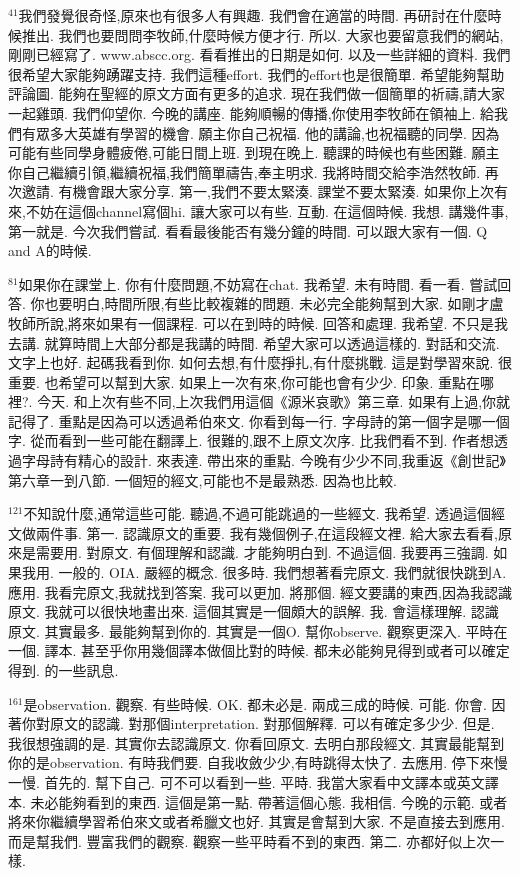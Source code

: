 \documentclass{book}
\begin{document}
$^{41}$我們發覺很奇怪,原來也有很多人有興趣.
我們會在適當的時間.
再研討在什麼時候推出.
我們也要問問李牧師,什麼時候方便才行.
所以.
大家也要留意我們的網站,剛剛已經寫了.
www.abscc.org.
看看推出的日期是如何.
以及一些詳細的資料.
我們很希望大家能夠踴躍支持.
我們這種effort.
我們的effort也是很簡單.
希望能夠幫助評論圖.
能夠在聖經的原文方面有更多的追求.
現在我們做一個簡單的祈禱,請大家一起雞頭.
我們仰望你.
今晚的講座.
能夠順暢的傳播,你使用李牧師在領袖上.
給我們有眾多大英雄有學習的機會.
願主你自己祝福.
他的講論,也祝福聽的同學.
因為可能有些同學身體疲倦,可能日間上班.
到現在晚上.
聽課的時候也有些困難.
願主你自己繼續引領,繼續祝福,我們簡單禱告,奉主明求.
我將時間交給李浩然牧師.
再次邀請.
有機會跟大家分享.
第一,我們不要太緊湊.
課堂不要太緊湊.
如果你上次有來,不妨在這個channel寫個hi.
讓大家可以有些.
互動.
在這個時候.
我想.
講幾件事,第一就是.
今次我們嘗試.
看看最後能否有幾分鐘的時間.
可以跟大家有一個.
Q and A的時候.

$^{81}$如果你在課堂上.
你有什麼問題,不妨寫在chat.
我希望.
未有時間.
看一看.
嘗試回答.
你也要明白,時間所限,有些比較複雜的問題.
未必完全能夠幫到大家.
如剛才盧牧師所說,將來如果有一個課程.
可以在到時的時候.
回答和處理.
我希望.
不只是我去講.
就算時間上大部分都是我講的時間.
希望大家可以透過這樣的.
對話和交流.
文字上也好.
起碼我看到你.
如何去想,有什麼掙扎,有什麼挑戰.
這是對學習來說.
很重要.
也希望可以幫到大家.
如果上一次有來,你可能也會有少少.
印象.
重點在哪裡?.
今天.
和上次有些不同,上次我們用這個《源米哀歌》第三章.
如果有上過,你就記得了.
重點是因為可以透過希伯來文.
你看到每一行.
字母詩的第一個字是哪一個字.
從而看到一些可能在翻譯上.
很難的,跟不上原文次序.
比我們看不到.
作者想透過字母詩有精心的設計.
來表達.
帶出來的重點.
今晚有少少不同,我重返《創世記》第六章一到八節.
一個短的經文,可能也不是最熟悉.
因為也比較.

$^{121}$不知說什麼,通常這些可能.
聽過,不過可能跳過的一些經文.
我希望.
透過這個經文做兩件事.
第一.
認識原文的重要.
我有幾個例子,在這段經文裡.
給大家去看看,原來是需要用.
對原文.
有個理解和認識.
才能夠明白到.
不過這個.
我要再三強調.
如果我用.
一般的.
OIA.
嚴經的概念.
很多時.
我們想著看完原文.
我們就很快跳到A.
應用.
我看完原文,我就找到答案.
我可以更加.
將那個.
經文要講的東西,因為我認識原文.
我就可以很快地畫出來.
這個其實是一個頗大的誤解.
我.
會這樣理解.
認識原文.
其實最多.
最能夠幫到你的.
其實是一個O.
幫你observe.
觀察更深入.
平時在一個.
譯本.
甚至乎你用幾個譯本做個比對的時候.
都未必能夠見得到或者可以確定得到.
的一些訊息.

$^{161}$是observation.
觀察.
有些時候.
OK.
都未必是.
兩成三成的時候.
可能.
你會.
因著你對原文的認識.
對那個interpretation.
對那個解釋.
可以有確定多少少.
但是.
我很想強調的是.
其實你去認識原文.
你看回原文.
去明白那段經文.
其實最能幫到你的是observation.
有時我們要.
自我收斂少少,有時跳得太快了.
去應用.
停下來慢一慢.
首先的.
幫下自己.
可不可以看到一些.
平時.
我當大家看中文譯本或英文譯本.
未必能夠看到的東西.
這個是第一點.
帶著這個心態.
我相信.
今晚的示範.
或者將來你繼續學習希伯來文或者希臘文也好.
其實是會幫到大家.
不是直接去到應用.
而是幫我們.
豐富我們的觀察.
觀察一些平時看不到的東西.
第二.
亦都好似上次一樣.
\end{document}
